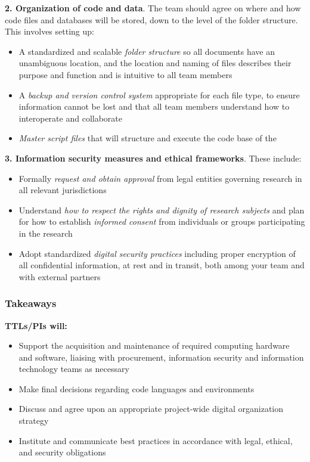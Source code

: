 \documentclass[
]{book}
\providecommand{\tightlist}{%
  \setlength{\itemsep}{0pt}\setlength{\parskip}{0pt}}
\begin{document}
\begin{summary}
\textbf{2. Organization of code and data}. The team should agree on where and how code files and databases will be stored, down to the level of the folder structure. This involves setting up:

\begin{itemize}
\tightlist
\item
  A standardized and scalable \emph{folder structure} so all documents have an unambiguous location, and the location and naming of files describes their purpose and function and is intuitive to all team members
\item
  A \emph{backup and version control system} appropriate for each file type, to ensure information cannot be lost and that all team members understand how to interoperate and collaborate
\item
  \emph{Master script files} that will structure and execute the code base of the
\end{itemize}

\textbf{3. Information security measures and ethical frameworks}. These include:

\begin{itemize}
\tightlist
\item
  Formally \emph{request and obtain approval} from legal entities governing research in all relevant jurisdictions
\item
  Understand \emph{how to respect the rights and dignity of research subjects} and plan for how to establish \emph{informed consent} from individuals or groups participating in the research
\item
  Adopt standardized \emph{digital security practices} including proper encryption of all confidential information, at rest and in transit, both among your team and with external partners
\end{itemize}

\hypertarget{takeaways-1}{%
\subsubsection*{Takeaways}\label{takeaways-1}}

\textbf{TTLs/PIs will:}

\begin{itemize}
\tightlist
\item
  Support the acquisition and maintenance of required computing hardware and software, liaising with procurement, information security and information technology teams as necessary
\item
  Make final decisions regarding code languages and environments
\item
  Discuss and agree upon an appropriate project-wide digital organization strategy\\
\item
  Institute and communicate best practices in accordance with legal, ethical, and security obligations
\end{itemize}


\end{summary}
\end{document}
